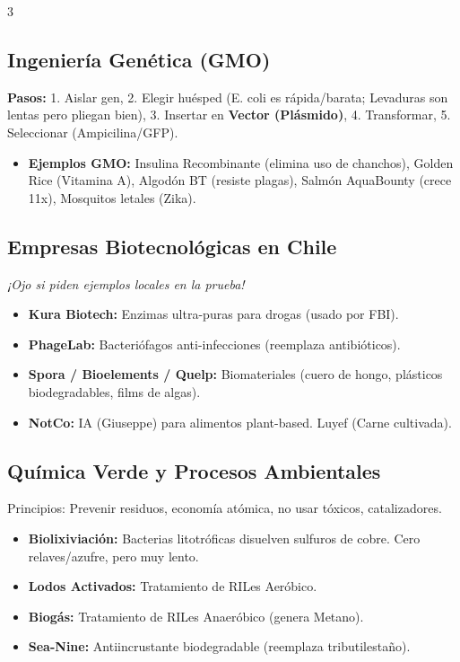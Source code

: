 \documentclass[11pt,landscape,letterpaper]{extarticle}
\begin{document}
\begin{multicols*}{3}
	\subsection{Ingeniería Genética (GMO)}
	\textbf{Pasos:} 1. Aislar gen, 2. Elegir huésped (E. coli es rápida/barata; Levaduras son lentas pero pliegan bien), 3. Insertar en \textbf{Vector (Plásmido)}, 4. Transformar, 5. Seleccionar (Ampicilina/GFP).
	\begin{itemize}
		\item \textbf{Ejemplos GMO:} Insulina Recombinante (elimina uso de chanchos), Golden Rice (Vitamina A), Algodón BT (resiste plagas), Salmón AquaBounty (crece 11x), Mosquitos letales (Zika).
	\end{itemize}

	\subsection{Empresas Biotecnológicas en Chile}
	\textit{¡Ojo si piden ejemplos locales en la prueba!}
	\begin{itemize}
		\item \textbf{Kura Biotech:} Enzimas ultra-puras para drogas (usado por FBI).
		\item \textbf{PhageLab:} Bacteriófagos anti-infecciones (reemplaza antibióticos).
		\item \textbf{Spora / Bioelements / Quelp:} Biomateriales (cuero de hongo, plásticos biodegradables, films de algas).
		\item \textbf{NotCo:} IA (Giuseppe) para alimentos plant-based. Luyef (Carne cultivada).
	\end{itemize}

	\subsection{Química Verde y Procesos Ambientales}
	Principios: Prevenir residuos, economía atómica, no usar tóxicos, catalizadores.
	\begin{itemize}
		\item \textbf{Biolixiviación:} Bacterias litotróficas disuelven sulfuros de cobre. Cero relaves/azufre, pero muy lento.
		\item \textbf{Lodos Activados:} Tratamiento de RILes Aeróbico.
		\item \textbf{Biogás:} Tratamiento de RILes Anaeróbico (genera Metano).
		\item \textbf{Sea-Nine:} Antiincrustante biodegradable (reemplaza tributilestaño).
	\end{itemize}


\end{multicols*}
\end{document}
